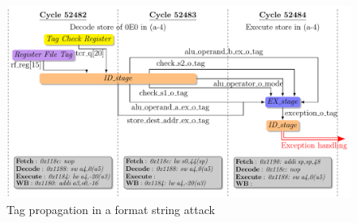 \begin{figure}[ht]
    \centering
    \includegraphics[width=\linewidth]{c3_vulnerabilities_assessment/img/wuftpd/full_ftpd_short.pdf}
    \caption{Tag propagation in a format string attack}
    \label{fig:study_mem_overwriting_tag_propagation}
 \end{figure}

